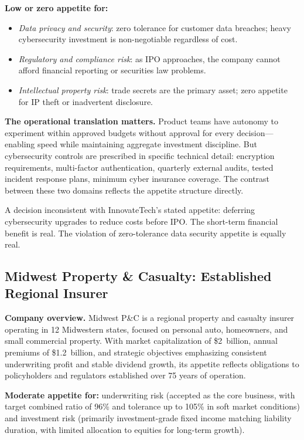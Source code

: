\documentclass[11pt,openany]{book}
\providecommand{\tightlist}{\setlength{\itemsep}{0pt}\setlength{\parskip}{0pt}}
\begin{document}
\textbf{Low or zero appetite for:}
\begin{itemize}\tightlist
  \item \emph{Data privacy and security}: zero tolerance for customer data
        breaches; heavy cybersecurity investment is non-negotiable regardless
        of cost.
  \item \emph{Regulatory and compliance risk}: as IPO approaches, the company
        cannot afford financial reporting or securities law problems.
  \item \emph{Intellectual property risk}: trade secrets are the primary asset;
        zero appetite for IP theft or inadvertent disclosure.
\end{itemize}

\textbf{The operational translation matters.} Product teams have autonomy to
experiment within approved budgets without approval for every decision---enabling
speed while maintaining aggregate investment discipline. But cybersecurity controls
are prescribed in specific technical detail: encryption requirements, multi-factor
authentication, quarterly external audits, tested incident response plans, minimum
cyber insurance coverage. The contrast between these two domains reflects the
appetite structure directly.

A decision inconsistent with InnovateTech's stated appetite: deferring
cybersecurity upgrades to reduce costs before IPO. The short-term financial
benefit is real. The violation of zero-tolerance data security appetite is
equally real.

\subsection{Midwest Property \& Casualty: Established Regional Insurer}
\label{subsec:midwest-pc}

\textbf{Company overview.} Midwest P\&C is a regional property and casualty
insurer operating in 12 Midwestern states, focused on personal auto, homeowners,
and small commercial property. With market capitalization of \$2~billion, annual
premiums of \$1.2~billion, and strategic objectives emphasizing consistent
underwriting profit and stable dividend growth, its appetite reflects obligations
to policyholders and regulators established over 75 years of operation.

\textbf{Moderate appetite for:} underwriting risk (accepted as the core
business, with target combined ratio of 96\% and tolerance up to 105\% in soft
market conditions) and investment risk (primarily investment-grade fixed income
matching liability duration, with limited allocation to equities for long-term
growth).
\end{document}

